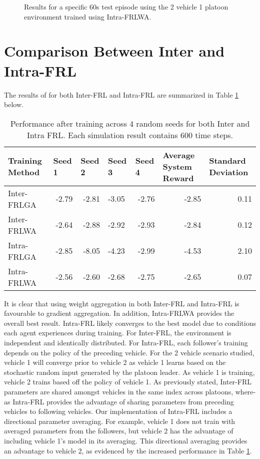 \begin{figure}[H]
    \centering
    
    \caption{Results for a specific 60s test episode using the 2 vehicle 1 platoon 
    environment trained using Intra-FRLWA.}
    \label{fig:intraFRL-simresult}
\end{figure}

\section{Comparison Between Inter and Intra-FRL}
The results of for both Inter-FRL and Intra-FRL are summarized in Table \ref{tab:inter_vs_intra} below.

\begin{table}[H]
    \centering
    \scriptsize
    \caption{Performance after training across 4 random seeds for both Inter and Intra FRL. Each simulation result contains 600 time steps.}
    \begin{tabular}{lrrlrrr} \toprule
    \textbf{Training Method} & \multicolumn{1}{l}{\textbf{Seed 1}} & \multicolumn{1}{l}{\textbf{Seed 2}} & \multicolumn{1}{l}{\textbf{Seed 3}} & \multicolumn{1}{l}{\textbf{Seed 4}} & \multicolumn{1}{l}{\textbf{Average System Reward}} & \multicolumn{1}{l}{\textbf{Standard Deviation}} \\ \midrule
        Inter-FRLGA & -2.79 & -2.81 & -3.05 & -2.76 & -2.85 & 0.11 \\
        Inter-FRLWA & -2.64 & -2.88 & -2.92 & -2.93 & -2.84 & 0.12 \\
        Intra-FRLGA & -2.85 & -8.05 & -4.23 & -2.99 & -4.53 & 2.10 \\
        Intra-FRLWA & -2.56 & -2.60 & -2.68 & -2.75 & -2.65 & 0.07 \\ \bottomrule
    \end{tabular}
    \label{tab:inter_vs_intra}
\end{table}

It is clear that using weight aggregation in both Inter-FRL and Intra-FRL is favourable 
to gradient aggregation.  In addition, Intra-FRLWA provides the overall best result.  
Intra-FRL likely converges to the best model due to conditions each agent experiences 
during training.  For Inter-FRL, the environment is independent and identically 
distributed. For Intra-FRL, each follower's training depends on the policy of the 
preceding vehicle.  For the 2 vehicle scenario studied, vehicle 1 will converge prior 
to vehicle 2 as vehicle 1 learns based on the stochastic random input generated by 
the platoon leader. As vehicle 1 is training, vehicle 2 trains based off the policy 
of vehicle 1. As previously stated, Inter-FRL parameters are shared amongst vehicles 
in the same index across platoons, where-as Intra-FRL provides the advantage of 
sharing parameters from preceding vehicles to following vehicles. Our implementation 
of Intra-FRL includes a directional parameter averaging.  For example, vehicle 1 does 
not train with averaged parameters from the followers, but vehicle 2 has the advantage 
of including vehicle 1's model in its averaging.  This directional averaging provides 
an advantage to vehicle 2, as evidenced by the increased performance in Table 
\ref{tab:inter_vs_intra}.  

